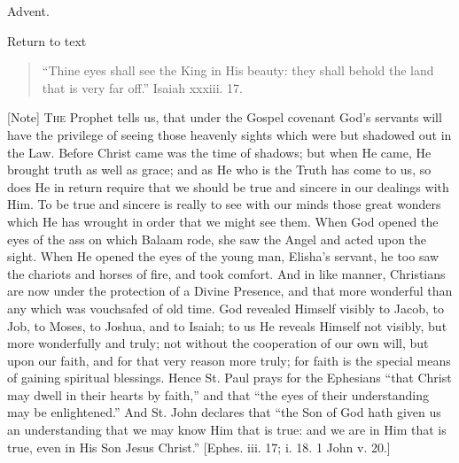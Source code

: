 
Advent.

Return to text


\begin{quote}

``Thine eyes shall see the King in His beauty: they shall
behold the land that is very far off.'' Isaiah xxxiii. 17.

\end{quote}

[Note] T\textsc{he} Prophet tells us,
that under the Gospel covenant God's servants will have the privilege
of seeing those heavenly sights which were but shadowed out in the
Law. Before Christ came was the time of shadows; but when He came, He
brought truth as well as grace; and as He who is the Truth has come to
us, so does He in return require that we should be true and sincere in
our dealings with Him. To be true and sincere is really to see with
our minds those great wonders which He has wrought in order that we
might see them. When God opened the eyes of the ass on which Balaam
rode, she saw the Angel and acted upon the sight. When He opened the
eyes of the young man, Elisha's servant, he too saw the chariots and
horses of fire, and took comfort. And in like manner, Christians are
now under the protection of a Divine Presence, and that more wonderful
than any which was vouchsafed of old time. God revealed Himself
visibly to Jacob, to Job, to Moses, to Joshua, and to Isaiah; to us He
reveals Himself not visibly, but more wonderfully and truly; not
without the cooperation of our own will, but upon our faith, and for
that very reason more truly; for faith is the special means of gaining
spiritual blessings. Hence St. Paul prays for the Ephesians ``that
Christ may dwell in their hearts by faith,'' and that ``the
eyes of their understanding may be enlightened.'' And St. John
declares that ``the Son of God hath given us an understanding that
we may know Him that is true: and we are in Him that is true, even in
His Son Jesus Christ.'' [Ephes. iii. 17; i. 18. 1 John v. 20.]


